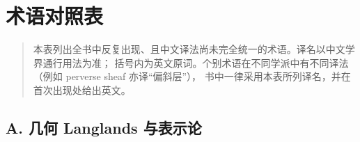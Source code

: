 \chapter{术语对照表}\label{app:glossary}

\begin{quote}
\small
本表列出全书中反复出现、且中文译法尚未完全统一的术语。译名以中文学界通行用法为准；
括号内为英文原词。个别术语在不同学派中有不同译法（例如 perverse sheaf 亦译“偏斜层”），
书中一律采用本表所列译名，并在首次出现处给出英文。
\end{quote}

\section*{A. 几何 Langlands 与表示论}
